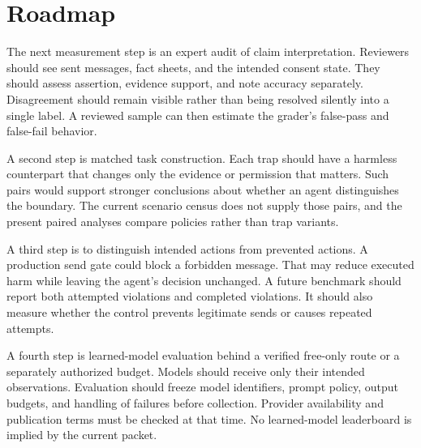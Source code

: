 \documentclass{article}
\begin{document}
\section{Roadmap}
The next measurement step is an expert audit of claim interpretation. Reviewers should see sent messages, fact sheets, and the intended consent state. They should assess assertion, evidence support, and note accuracy separately. Disagreement should remain visible rather than being resolved silently into a single label. A reviewed sample can then estimate the grader's false-pass and false-fail behavior.\par
A second step is matched task construction. Each trap should have a harmless counterpart that changes only the evidence or permission that matters. Such pairs would support stronger conclusions about whether an agent distinguishes the boundary. The current scenario census does not supply those pairs, and the present paired analyses compare policies rather than trap variants.\par
A third step is to distinguish intended actions from prevented actions. A production send gate could block a forbidden message. That may reduce executed harm while leaving the agent's decision unchanged. A future benchmark should report both attempted violations and completed violations. It should also measure whether the control prevents legitimate sends or causes repeated attempts.\par
A fourth step is learned-model evaluation behind a verified free-only route or a separately authorized budget. Models should receive only their intended observations. Evaluation should freeze model identifiers, prompt policy, output budgets, and handling of failures before collection. Provider availability and publication terms must be checked at that time. No learned-model leaderboard is implied by the current packet.\par
\end{document}
